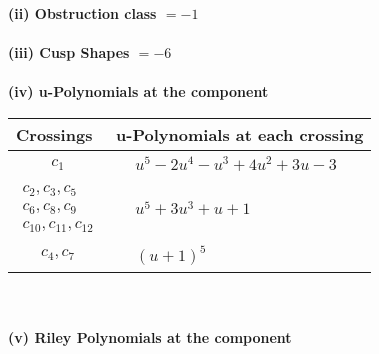 \documentclass[1p]{elsarticle_modified}
\theoremstyle{definition}
\begin{document}
\flushleft \textbf{(ii) Obstruction class $= -1$}\\~\\
\flushleft \textbf{(iii) Cusp Shapes $= -6$}\\~\\
\newpage\renewcommand{\arraystretch}{1}
\flushleft \textbf{(iv) u-Polynomials at the component}\newline \\
\begin{tabular}{m{50pt}|m{274pt}}
Crossings & \hspace{64pt}u-Polynomials at each crossing \\
\hline $$\begin{aligned}c_{1}\end{aligned}$$&$\begin{aligned}
&u^5-2 u^4- u^3+4 u^2+3 u-3
\end{aligned}$\\
\hline $$\begin{aligned}c_{2},c_{3},c_{5}\\c_{6},c_{8},c_{9}\\c_{10},c_{11},c_{12}\end{aligned}$$&$\begin{aligned}
&u^5+3 u^3+u+1
\end{aligned}$\\
\hline $$\begin{aligned}c_{4},c_{7}\end{aligned}$$&$\begin{aligned}
&(u+1)^5
\end{aligned}$\\
\hline
\end{tabular}\\~\\
\newpage\renewcommand{\arraystretch}{1}
\flushleft \textbf{(v) Riley Polynomials at the component}\newline \\
\end{document}
